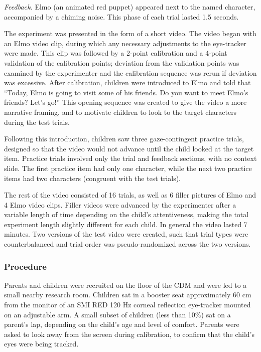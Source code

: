 \documentclass[man]{apa2}
\begin{document}
\emph{Feedback.}  Elmo (an animated red puppet) appeared next to the named character, accompanied by a chiming noise. This phase of each trial lasted 1.5 seconds.  

The experiment was presented in the form of a short video.  The video began with an Elmo video clip, during which any necessary adjustments to the eye-tracker were made.  This clip was followed by a 2-point calibration and a 4-point validation of the calibration points; deviation from the validation points was examined by the experimenter and the calibration sequence was rerun if deviation was excessive.  After calibration, children were introduced to Elmo and told that ``Today, Elmo is going to visit some of his friends.  Do you want to meet Elmo's friends?  Let's go!''  This opening sequence was created to give the video a more narrative framing, and to motivate children to look to the target characters during the test trials.  

Following this introduction, children saw three gaze-contingent practice trials, designed so that the video would not advance until the child looked at the target item. Practice trials involved only the trial and feedback sections, with no context slide.  The first practice item had only one character, while the next two practice items had two characters (congruent with the test trials).  

The rest of the video consisted of 16 trials, as well as 6 filler pictures of Elmo and 4 Elmo video clips.  Filler videos were advanced by the experimenter after a variable length of time depending on the child's attentiveness, making the total experiment length slightly different for each child. In general the video lasted 7 minutes.  Two versions of the test video were created, such that trial types were counterbalanced and trial order was pseudo-randomized across the two versions. 

\subsubsection{Procedure}

Parents and children were recruited on the floor of the CDM and were led to a small nearby research room.  Children sat in a booster seat approximately 60 cm from the monitor of an SMI RED 120 Hz corneal reflection eye-tracker mounted on an adjustable arm.  A small subset of children  (less than 10\%) sat on a parent's lap, depending on the child's age and level of comfort.  Parents were asked to look away from the screen during calibration, to confirm that the child's eyes were being tracked.  
\end{document}
